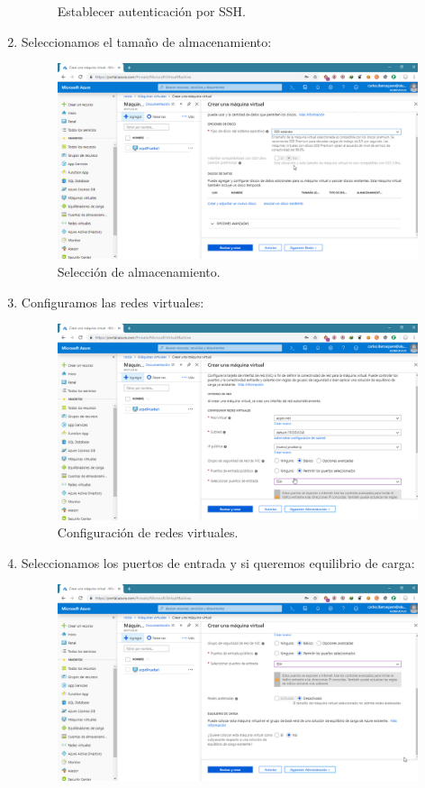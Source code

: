 \begin{enumerate}
\begin{figure}[h]
		\caption{Establecer autenticación por SSH.}
		\label{Establecer autenticación por SSH}
	\end{figure}
\newpage
	\item Seleccionamos el tamaño de almacenamiento:
	\begin{figure}[h]
		\centering
		\includegraphics[scale=0.35]{ImagenesAzure/3.png}
		\caption{Selección de almacenamiento.}
		\label{Selección de almacenamiento2}
	\end{figure}
	\item Configuramos las redes virtuales:
	\begin{figure}[h]
		\centering
		\includegraphics[scale=0.35]{ImagenesAzure/4.png}
		\caption{Configuración de redes virtuales.}
		\label{Configuración de redes virtuales}
	\end{figure}
\newpage
	\item Seleccionamos los puertos de entrada y si queremos equilibrio de carga:
	\begin{figure}[h]
		\centering
		\includegraphics[scale=0.35]{ImagenesAzure/5.png}

\end{figure}
\end{enumerate}
